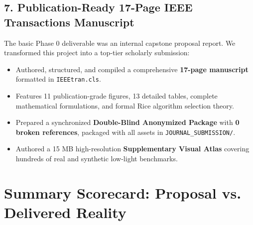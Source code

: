 \documentclass[10pt,a4paper]{article}
\begin{document}
\subsection{7. Publication-Ready 17-Page IEEE Transactions Manuscript}
The basic Phase 0 deliverable was an internal capstone proposal report. We transformed this project into a top-tier scholarly submission:
\begin{itemize}[noitemsep]
    \item Authored, structured, and compiled a comprehensive \textbf{17-page manuscript} formatted in \texttt{IEEEtran.cls}.
    \item Features 11 publication-grade figures, 13 detailed tables, complete mathematical formulations, and formal Rice algorithm selection theory.
    \item Prepared a synchronized \textbf{Double-Blind Anonymized Package} with \textbf{0 broken references}, packaged with all assets in \texttt{JOURNAL\_SUBMISSION/}.
    \item Authored a 15 MB high-resolution \textbf{Supplementary Visual Atlas} covering hundreds of real and synthetic low-light benchmarks.
\end{itemize}

\vspace{0.3cm}

\section{Summary Scorecard: Proposal vs. Delivered Reality}
\end{document}
